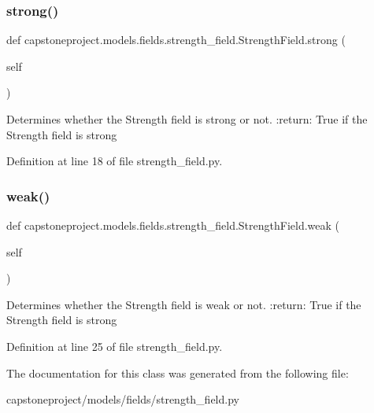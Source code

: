 \subsubsection{\texorpdfstring{strong()}{strong()}}
{\footnotesize\ttfamily def capstoneproject.\+models.\+fields.\+strength\+\_\+field.\+Strength\+Field.\+strong (\begin{DoxyParamCaption}\item[{}]{self }\end{DoxyParamCaption})}

\begin{DoxyVerb}Determines whether the Strength field is strong or not.
:return: True if the Strength field is strong
\end{DoxyVerb}
 

Definition at line 18 of file strength\+\_\+field.\+py.

\mbox{\label{classcapstoneproject_1_1models_1_1fields_1_1strength__field_1_1_strength_field_af5b40866e3b47e5c7cca9b4761d6e052}} 
\subsubsection{\texorpdfstring{weak()}{weak()}}
{\footnotesize\ttfamily def capstoneproject.\+models.\+fields.\+strength\+\_\+field.\+Strength\+Field.\+weak (\begin{DoxyParamCaption}\item[{}]{self }\end{DoxyParamCaption})}

\begin{DoxyVerb}Determines whether the Strength field is weak or not.
:return: True if the Strength field is strong
\end{DoxyVerb}
 

Definition at line 25 of file strength\+\_\+field.\+py.



The documentation for this class was generated from the following file\+:\begin{DoxyCompactItemize}
\item 
capstoneproject/models/fields/strength\+\_\+field.\+py\end{DoxyCompactItemize}
